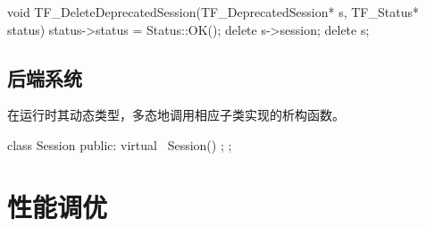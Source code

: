 \begin{content}
\begin{leftbar}
\begin{c++}[caption={tensorflow/c/c\_api.c}]
void TF_DeleteDeprecatedSession(TF_DeprecatedSession* s, TF_Status* status) {
  status->status = Status::OK();
  delete s->session;
  delete s;
}
\end{c++}
\end{leftbar}

\subsection{后端系统}

在运行时其动态类型，多态地调用相应子类实现的析构函数。

\begin{leftbar}
\begin{c++}[caption={tensorflow/core/common\_runtime/session.h}]
class Session {
public:
  virtual ~Session() {};
};
\end{c++}
\end{leftbar}

\end{content}

\section{性能调优}

